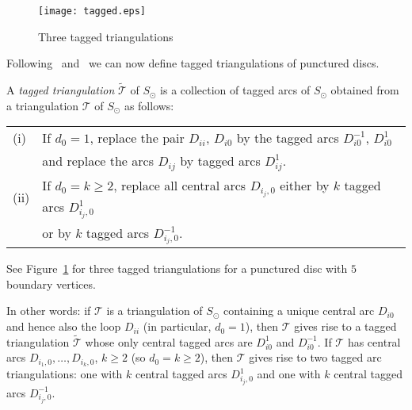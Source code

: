 \documentclass[a4paper]{amsart}
\begin{document}
\begin{figure}
\begin{center}
\texttt{[image: tagged.eps]}
\caption{Three tagged triangulations}
\label{fig:tagged}
\end{center}
\end{figure}

Following~\cite[Definition 7.7]{fst06} and~\cite[Section 2.4]{schiffler06} we can now define tagged 
triangulations of punctured discs. 

\begin{definition}\label{def:taggedtriangulation}
A {\em tagged triangulation} $\widetilde{\mathcal T}$ of $S_{\odot}$ is a collection of 
tagged arcs of $S_{\odot}$ obtained from a triangulation ${\mathcal T}$ of $S_{\odot}$ 
as follows: 

\begin{tabular}{ll}
(i) & If $d_0=1$, replace the pair $D_{ii}$, $D_{i0}$ by the tagged arcs $D_{i0}^{-1}$, $D_{i0}^1$\\ 
    & and replace the arcs $D_{ij}$ by tagged arcs $D_{ij}^1$. \\
(ii) & If $d_0=k\ge 2$, replace all central arcs $D_{i_j,0}$ either by $k$ tagged arcs $D_{i_j,0}^1$ \\
     &  or by $k$ tagged arcs $D_{i_j,0}^{-1}$. 
\end{tabular}
\end{definition}

See Figure~\ref{fig:tagged} for three 
tagged triangulations for a punctured disc with $5$ boundary vertices. 

In other words: if ${\mathcal T}$ is a triangulation of $S_{\odot}$ containing a unique central 
arc $D_{i0}$ and hence also the loop $D_{ii}$ (in particular, $d_0=1$), then ${\mathcal T}$ gives rise to a 
tagged triangulation 
$\widetilde{\mathcal T}$ whose only central tagged arcs are $D_{i0}^1$ and $D_{i0}^{-1}$. 
If ${\mathcal T}$ has central arcs $D_{i_1,0},\dots,D_{i_k,0}$, $k\ge 2$ (so $d_0=k\ge 2$), 
then 
${\mathcal T}$ gives rise to two tagged arc triangulations: one with $k$ central tagged 
arcs $D_{i_j,0}^1$ and one with $k$ central tagged arcs $D_{i_j,0}^{-1}$. 
\end{document}
